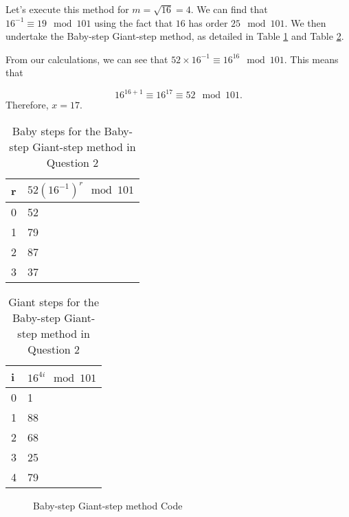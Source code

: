 Let's execute this method for $m = \sqrt{16} = 4$. We can find that $16^{-1} \equiv 19 \mod 101$ using the fact that $16$ has order $25 \mod 101$. We then undertake the Baby-step Giant-step method, as detailed in Table \ref{tab:baby} and Table \ref{tab:giant}. 

From our calculations, we can see that $52 \times 16^{-1} \equiv 16^{16} \mod 101$. This means that

\[16^{16+1} \equiv 16^{17} \equiv 52 \mod 101.\] Therefore, $x=17$.

\begin{table}
\centering
\begin{tabular}{l l}
r & $52(16^{-1})^{r} \mod 101$ \\\hline
0 & 52 \\\hline
1 & 79 \\\hline
2 & 87 \\\hline
3 & 37 \\\hline
\end{tabular}
\caption{Baby steps for the Baby-step Giant-step method in Question 2}
\label{tab:baby}
\end{table}

\begin{table}
\centering
\begin{tabular}{l l}
i & $16^{ 4 i} \mod 101$ \\\hline
0 & 1 \\\hline
1 & 88 \\\hline
2 & 68 \\\hline
3 & 25 \\\hline
4 & 79 \\\hline
\end{tabular}
\caption{Giant steps for the Baby-step Giant-step method in Question 2}
\label{tab:giant}
\end{table}

\begin{figure}[P]
\caption{Baby-step Giant-step method Code}

\end{figure}
